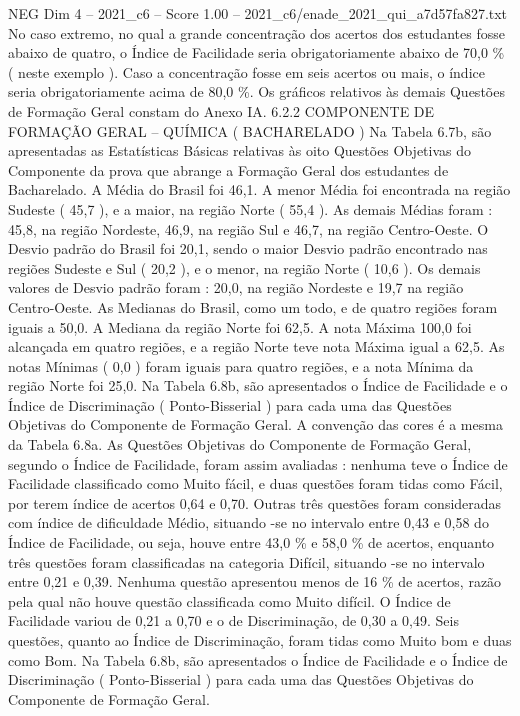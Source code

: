 \begin{textsample}{NEG Dim 4 – 2021\_c6 – Score 1.00 – 2021\_c6/enade\_2021\_qui\_a7d57fa827.txt}
No caso extremo, no qual a grande concentração dos acertos dos estudantes fosse abaixo de quatro, o Índice de Facilidade seria obrigatoriamente abaixo de 70,0 \% ( neste exemplo ).
Caso a concentração fosse em seis acertos ou mais, o índice seria obrigatoriamente acima de 80,0 \%.
Os gráficos relativos às demais Questões de Formação Geral constam do Anexo IA. 6.2.2 COMPONENTE DE FORMAÇÃO GERAL – QUÍMICA ( BACHARELADO ) Na Tabela 6.7b, são apresentadas as Estatísticas Básicas relativas às oito Questões Objetivas do Componente da prova que abrange a Formação Geral dos estudantes de Bacharelado.
A Média do Brasil foi 46,1.
A menor Média foi encontrada na região Sudeste ( 45,7 ), e a maior, na região Norte ( 55,4 ).
As demais Médias foram : 45,8, na região Nordeste, 46,9, na região Sul e 46,7, na região Centro-Oeste.
O Desvio padrão do Brasil foi 20,1, sendo o maior Desvio padrão encontrado nas regiões Sudeste e Sul ( 20,2 ), e o menor, na região Norte ( 10,6 ).
Os demais valores de Desvio padrão foram : 20,0, na região Nordeste e 19,7 na região Centro-Oeste.
As Medianas do Brasil, como um todo, e de quatro regiões foram iguais a 50,0.
A Mediana da região Norte foi 62,5.
A nota Máxima 100,0 foi alcançada em quatro regiões, e a região Norte teve nota Máxima igual a 62,5.
As notas Mínimas ( 0,0 ) foram iguais para quatro regiões, e a nota Mínima da região Norte foi 25,0.
Na Tabela 6.8b, são apresentados o Índice de Facilidade e o Índice de Discriminação ( Ponto-Bisserial ) para cada uma das Questões Objetivas do Componente de Formação Geral.
A convenção das cores é a mesma da Tabela 6.8a.
As Questões Objetivas do Componente de Formação Geral, segundo o Índice de Facilidade, foram assim avaliadas : nenhuma teve o Índice de Facilidade classificado como Muito fácil, e duas questões foram tidas como Fácil, por terem índice de acertos 0,64 e 0,70.
Outras três questões foram consideradas com índice de dificuldade Médio, situando -se no intervalo entre 0,43 e 0,58 do Índice de Facilidade, ou seja, houve entre 43,0 \% e 58,0 \% de acertos, enquanto três questões foram classificadas na categoria Difícil, situando -se no intervalo entre 0,21 e 0,39.
Nenhuma questão apresentou menos de 16 \% de acertos, razão pela qual não houve questão classificada como Muito difícil.
O Índice de Facilidade variou de 0,21 a 0,70 e o de Discriminação, de 0,30 a 0,49.
Seis questões, quanto ao Índice de Discriminação, foram tidas como Muito bom e duas como Bom.
Na Tabela 6.8b, são apresentados o Índice de Facilidade e o Índice de Discriminação ( Ponto-Bisserial ) para cada uma das Questões Objetivas do Componente de Formação Geral.

\end{textsample}
